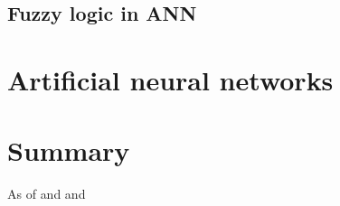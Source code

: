 \documentclass[a4paper,11pt]{article}
\begin{document}
\subsection{Fuzzy logic in ANN}


\section{Artificial neural networks}



\clearpage
\section{Summary} 

As of \cite{fuzzy_db} and \cite{seattlerobotics} and \cite{fuzzy_sets_zadeh}


\clearpage
\label{Bibliography} 
%

\footnotesize{  }


%
%
%
\end{document}
